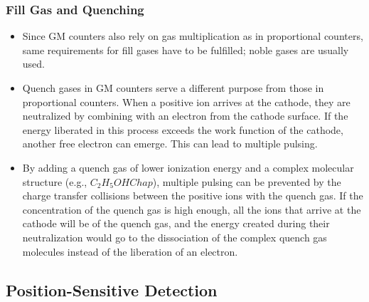 \subsubsection{Fill Gas and Quenching}
\begin{itemize}
    \item Since GM counters also rely on gas multiplication as in proportional counters, same requirements for fill gases have to be fulfilled; noble gases are usually used. 
    \item Quench gases in GM counters serve a different purpose from those in proportional counters. When a positive ion arrives at the cathode, they are neutralized by combining with an electron from the cathode surface. If the energy liberated in this process exceeds the work function of the cathode, another free electron can emerge. This can lead to multiple pulsing. 
    \item By adding a quench gas of lower ionization energy and a complex molecular structure (e.g., $C_2H_5OHChap$), multiple pulsing can be prevented by the charge transfer collisions between the positive ions with the quench gas. If the concentration of the quench gas is high enough, all the ions that arrive at the cathode will be of the quench gas, and the energy created during their neutralization would go to the dissociation of the complex quench gas molecules instead of the liberation of an electron.  
\end{itemize}

\subsection{Position-Sensitive Detection}